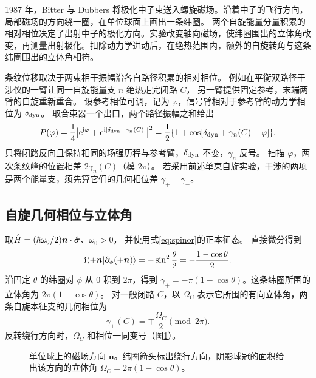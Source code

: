 1987 年，Bitter 与 Dubbers 将极化中子束送入螺旋磁场。沿着中子的飞行方向，局部磁场的方向绕一圈，在单位球面上画出一条纬圈。
两个自旋能量分量积累的相对相位决定了出射中子的极化方向。实验改变轴向磁场，使纬圈围出的立体角改变，再测量出射极化。扣除动力学进动后，在绝热范围内，额外的自旋转角与这条纬圈围出的立体角相符\cite{berryneutron}。

条纹位移取决于两束相干振幅沿各自路径积累的相对相位。
例如在平衡双路径干涉仪的一臂让同一自旋能量支 $n$ 绝热走完闭路 $C$，
另一臂提供固定参考，末端两臂的自旋重新重合。
设参考相位可调，记为 $\varphi$，信号臂相对于参考臂的动力学相位为 $\delta_{\mathrm{dyn}}$。
取合束器一个出口，两个路径振幅之和给出
\begin{equation}
    P(\varphi) = \frac14\bigl\lvert\mathop{}\!\mathrm{e}^{\mathrm{i}\varphi}
        + \mathop{}\!\mathrm{e}^{\mathrm{i}[\delta_{\mathrm{dyn}}+\gamma_n(C)]}\bigr\rvert^2
        = \frac12\{1 + \cos[\delta_{\mathrm{dyn}} + \gamma_n(C) - \varphi]\}.
\end{equation}
只将闭路反向且保持相同的场强历程与参考臂，$\delta_{\mathrm{dyn}}$ 不变，$\gamma_n$ 反号。
扫描 $\varphi$，两次条纹峰的位置相差 $2\gamma_n(C)$（模 $2\pi$）。
若采用前述单束自旋实验，干涉的两项是两个能量支，须先算它们的几何相位差 $\gamma_+ - \gamma_-$。

\subsection{自旋几何相位与立体角}

取$\hat{H} = (\hbar\omega_0/2)\bm n \cdot \hat{\bm{\sigma}}$、$\omega_0 > 0$，
并使用式\eqref{eq:spinor}的正本征态。
直接微分得到
\begin{equation}
    \mathrm{i}\langle+\bm n\vert\partial_\phi(+\bm n)\rangle
    = -\sin^2\frac\theta2 = -\frac{1 - \cos\theta}{2}.
\end{equation}
沿固定 $\theta$ 的纬圈对 $\phi$ 从 $0$ 积到 $2\pi$，得到 $\gamma_+ = -\pi(1 - \cos\theta)$。这条纬圈所围的立体角为 $2\pi(1 - \cos\theta)$。
对一般闭路 $C$，以 $\Omega_C$ 表示它所围的有向立体角，两条自旋本征支的几何相位为
\begin{equation}
    \gamma_\pm(C) = \mp\frac{\Omega_C}{2}\pmod{2\pi}.
    \label{eq:spin-berry-solid-angle}
\end{equation}
反转绕行方向时，$\Omega_C$ 和相位一同变号（图\ref{fig:berry-cap}）。
\begin{figure}[htbp]
    \centering{}
    \caption{单位球上的磁场方向 $\bm n$。纬圈箭头标出绕行方向，阴影球冠的面积给出该方向的立体角 $\Omega_C = 2\pi(1 - \cos\theta)$。}\label{fig:berry-cap}
\end{figure}

